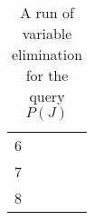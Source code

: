 \documentclass[12pt,a4paper]{article}
\begin{document}
\begin{table}[!ht]
\begin{tabular}{c|l|l|l|l}
6    &                                                                                    &                                                                             &                                                                                   &                                                                          \\
7    &                                                                                    &                                                                             &                                                                                   &                                                                          \\
8    &                                                                                    &                                                                             &                                                                                   &
\end{tabular}
\caption{A run of variable elimination for the query $P(J)$}
\label{table:VE}
\end{table}



\end{document}
